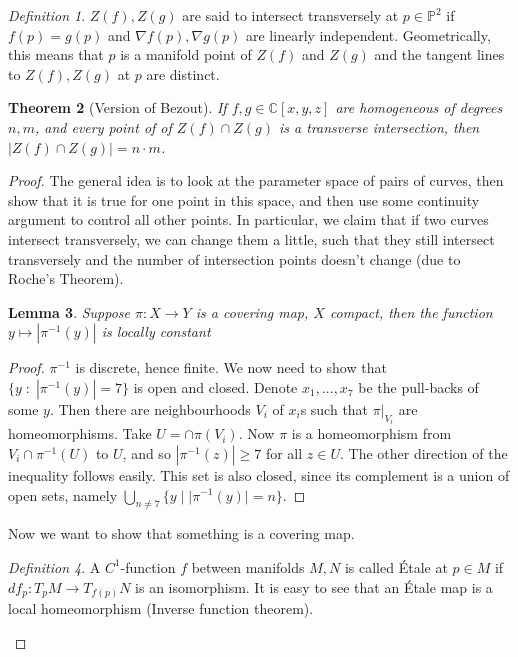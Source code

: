 \documentclass[12pt]{article}
\newtheorem{theorem}{Theorem}[section]
\newtheorem{lemma}[theorem]{Lemma}
\theoremstyle{remark}
\newtheorem{definition}[theorem]{Definition}
\newcommand{\C}{\mathbb{C}}
\begin{document}
\begin{definition}
$Z(f), Z(g)$ are said to intersect transversely at $p \in \mathbb{P}^2$ if $f(p) = g(p)$ and $\nabla f(p) , \nabla g(p)$ are linearly independent. Geometrically, this means that $p$ is a manifold point of $Z(f)$ and $Z(g)$ and the tangent lines to $Z(f), Z(g)$ at $p$ are distinct.
\end{definition}

\begin{theorem}[Version of Bezout]
If $f,g \in \C[x,y,z]$ are homogeneous of degrees $n,m$, and every point of of $Z(f) \cap Z(g)$ is a transverse intersection, then $|Z(f) \cap Z(g)| = n \cdot m$.

\end{theorem}

\begin{proof}
The general idea is to look at the parameter space of pairs of curves, then show that it is true for one point in this space, and then use some continuity argument to control all other points. In particular, we claim that if two curves intersect transversely, we can change them a little, such that they still intersect transversely and the number of intersection points doesn't change (due to Roche's Theorem).\\


\begin{lemma}
Suppose $\pi: X \rightarrow Y$ is a covering map, $X$ compact, then the function $y \mapsto | \pi^{-1}(y)|$ is locally constant
\end{lemma}

\begin{proof}
$\pi^{-1}$ is discrete, hence finite. We now need to show that $\{ y \; : \; |\pi^{-1}(y)| = 7  \}$ is open and closed. Denote $x_1,...,x_7$ be the pull-backs of some $y$. Then there are neighbourhoods $V_i$ of $x_i$s such that $\pi|_{V_i}$ are homeomorphisms. Take $U = \cap \pi(V_i)$. Now $\pi$ is a homeomorphism from $V_i \cap \pi^{-1}(U)$ to $U$, and so $|\pi^{-1}(z)| \geq 7$ for all $z \in U$. The other direction of the inequality follows easily. This set is also closed, since its complement is a union of open sets, namely $\bigcup_{n\neq 7} \{y \; | \; |\pi^{-1}(y)| = n  \}.
$
\end{proof}

Now we want to show that something is a covering map. 

\begin{definition}
A $C^{1}$-function $f$ between manifolds $M,N$ is called \'{E}tale at $p \in M$ if $df_p: T_pM \rightarrow T_{f(p)}N$ is an isomorphism. It is easy to see that an \'{E}tale map is a local homeomorphism (Inverse function theorem).
\end{definition}


\end{proof}
\end{document}
